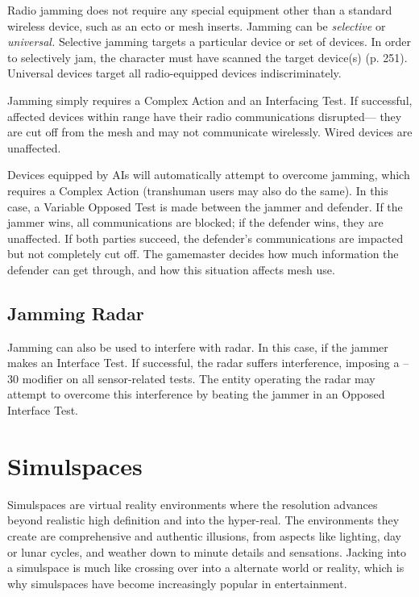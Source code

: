 Radio jamming does not require any special equipment
other than a standard wireless device, such as
an ecto or mesh inserts. Jamming can be \textit{selective }
or \textit{universal.} Selective jamming targets a particular 
device or set of devices. In order to selectively jam, 
the character must have scanned the target device(s) 
(p. 251). Universal devices target all radio-equipped 
devices indiscriminately.

Jamming simply requires a Complex Action and an 
Interfacing Test. If successful, affected devices within 
range have their radio communications disrupted—
they are cut off from the mesh and may not communicate
wirelessly. Wired devices are unaffected.

Devices equipped by AIs will automatically attempt 
to overcome jamming, which requires a Complex 
Action (transhuman users may also do the same). In 
this case, a Variable Opposed Test is made between 
the jammer and defender. If the jammer wins, all communications
are blocked; if the defender wins, they
are unaffected. If both parties succeed, the defender's 
communications are impacted but not completely cut 
off. The gamemaster decides how much information 
the defender can get through, and how this situation 
affects mesh use.

\subsection{Jamming Radar}

Jamming can also be used to interfere with radar. In 
this case, if the jammer makes an Interface Test. If 
successful, the radar suffers interference, imposing 
a –30 modifier on all sensor-related tests. The entity 
operating the radar may attempt to overcome this 
interference by beating the jammer in an Opposed 
Interface Test.

\section{Simulspaces}

Simulspaces are virtual reality environments where 
the resolution advances beyond realistic high definition
and into the hyper-real. The environments they
create are comprehensive and authentic illusions, from 
aspects like lighting, day or lunar cycles, and weather 
down to minute details and sensations. Jacking into 
a simulspace is much like crossing over into a alternate
world or reality, which is why simulspaces have
become increasingly popular in entertainment.

